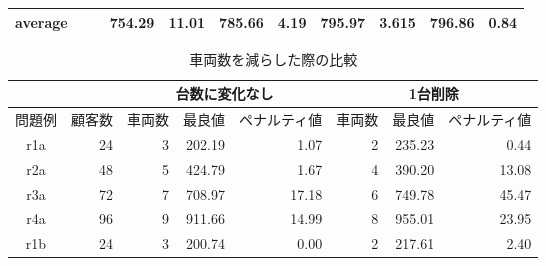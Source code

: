 \begin{landscape}
\begin{table}[]
\begin{tabular}{cllrrrrrrrr}
  average              &                         &                         & 754.29                        & 11.01                         & 785.66                         & 4.19                         & 795.97                         & 3.615                         & 796.86                         & 0.84                        \\ \hline
  \end{tabular}
  \end{table}
\end{landscape}




\begin{table}[]
\renewcommand{\arraystretch}{0.8}
\caption{車両数を減らした際の比較}
\label{m-1}
\begin{tabular}{cl|lll|lll}
\hline
                            & \multicolumn{1}{c|}{}    & \multicolumn{3}{c|}{台数に変化なし}                                               & \multicolumn{3}{c}{1台削除}                                                \\ \hline
問題例                          & \multicolumn{1}{c|}{顧客数} & \multicolumn{1}{c}{車両数} & \multicolumn{1}{c}{最良値} & \multicolumn{1}{c|}{ペナルティ値} & \multicolumn{1}{c}{車両数} & \multicolumn{1}{c}{最良値} & \multicolumn{1}{c}{ペナルティ値} \\ \hline
r1a                         & \multicolumn{1}{r|}{24}  & \multicolumn{1}{r}{3} & \multicolumn{1}{r}{202.19} & \multicolumn{1}{r|}{1.07}  & \multicolumn{1}{r}{2} & \multicolumn{1}{r}{235.23} & \multicolumn{1}{r}{0.44}  \\
r2a                         & \multicolumn{1}{r|}{48}  & \multicolumn{1}{r}{5} & \multicolumn{1}{r}{424.79} & \multicolumn{1}{r|}{1.67}  & \multicolumn{1}{r}{4} & \multicolumn{1}{r}{390.20} & \multicolumn{1}{r}{13.08}  \\
r3a                         & \multicolumn{1}{r|}{72}  & \multicolumn{1}{r}{7} & \multicolumn{1}{r}{708.97} & \multicolumn{1}{r|}{17.18}  & \multicolumn{1}{r}{6} & \multicolumn{1}{r}{749.78} & \multicolumn{1}{r}{45.47}  \\
r4a                         & \multicolumn{1}{r|}{96}  & \multicolumn{1}{r}{9} & \multicolumn{1}{r}{911.66} & \multicolumn{1}{r|}{14.99}  & \multicolumn{1}{r}{8} & \multicolumn{1}{r}{955.01} & \multicolumn{1}{r}{23.95}  \\
r1b                       & \multicolumn{1}{r|}{24}  & \multicolumn{1}{r}{3} & \multicolumn{1}{r}{200.74} & \multicolumn{1}{r|}{0.00}  & \multicolumn{1}{r}{2} & \multicolumn{1}{r}{217.61} & \multicolumn{1}{r}{2.40}  \\

\end{tabular}
\end{table}
